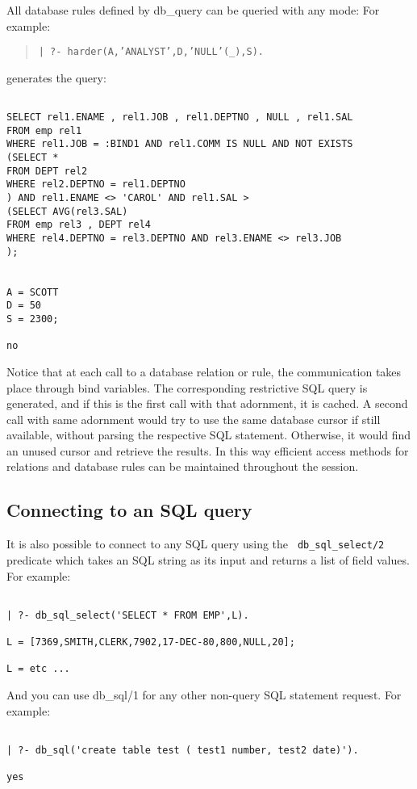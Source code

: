 All database rules defined by db\_query can be queried with any mode:
For example:
\begin{quote}

{\tt | ?- harder(A,'ANALYST',D,'NULL'(\_),S).}
\end{quote}

generates the query:
\begin{verbatim}

SELECT rel1.ENAME , rel1.JOB , rel1.DEPTNO , NULL , rel1.SAL
FROM emp rel1
WHERE rel1.JOB = :BIND1 AND rel1.COMM IS NULL AND NOT EXISTS
(SELECT *
FROM DEPT rel2
WHERE rel2.DEPTNO = rel1.DEPTNO
) AND rel1.ENAME <> 'CAROL' AND rel1.SAL > 
(SELECT AVG(rel3.SAL)
FROM emp rel3 , DEPT rel4
WHERE rel4.DEPTNO = rel3.DEPTNO AND rel3.ENAME <> rel3.JOB
);


A = SCOTT
D = 50
S = 2300;

no
\end{verbatim}

Notice that at each call to a database relation or rule, the
communication takes place through bind variables.  The corresponding
restrictive SQL query is generated, and if this is the first call with
that adornment, it is cached.  A second call with same adornment would
try to use the same database cursor if still available, without
parsing the respective SQL statement.  Otherwise, it would find an
unused cursor and retrieve the results.  In this way efficient access
methods for relations and database rules can be maintained throughout
the session.

\subsection{Connecting to an SQL query}


It is also possible to connect to any SQL query using the {\tt
db\_sql\_select/2} predicate which takes an SQL string as its input and
returns a list of field values.  For example:
\begin{verbatim}

| ?- db_sql_select('SELECT * FROM EMP',L).

L = [7369,SMITH,CLERK,7902,17-DEC-80,800,NULL,20];

L = etc ...
\end{verbatim}

And you can use db\_sql/1 for any other non-query SQL statement request.  For 
example:
\begin{verbatim}

| ?- db_sql('create table test ( test1 number, test2 date)').

yes
\end{verbatim}

